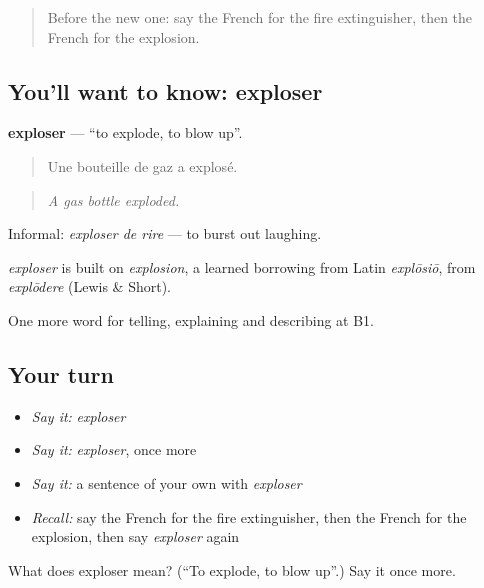 \begin{quote}
Before the new one: say the French for the fire extinguisher, then the French for the explosion.
\end{quote}

\subsection*{You'll want to know: exploser}
\textbf{exploser} — \textquotedblleft{}to explode, to blow up\textquotedblright{}.

\begin{quote}
Une bouteille de gaz a explosé.
\end{quote}

\begin{quote}
\emph{A gas bottle exploded.}
\end{quote}

Informal: \emph{exploser de rire} — to burst out laughing.

\begin{cousinweb}
\emph{exploser} is built on \emph{explosion}, a learned borrowing from Latin \emph{explōsiō}, from \emph{explōdere} (Lewis \& Short).
\end{cousinweb}

\begin{grammarlens}[title={What you've built}]
One more word for telling, explaining and describing at B1.
\end{grammarlens}

\subsection*{Your turn}
\begin{itemize}
\raggedright
  \item \emph{Say it:} \emph{exploser}
  \item \emph{Say it:} \emph{exploser}, once more
  \item \emph{Say it:} a sentence of your own with \emph{exploser}
  \item \emph{Recall:} say the French for the fire extinguisher, then the French for the explosion, then say \emph{exploser} again
\end{itemize}

\begin{tcolorbox}[breakable,colback=teal!4,colframe=teal!35!black,title={Before you move on}]
What does exploser mean? (\textquotedblleft{}To explode, to blow up\textquotedblright{}.) Say it once more.
\end{tcolorbox}
